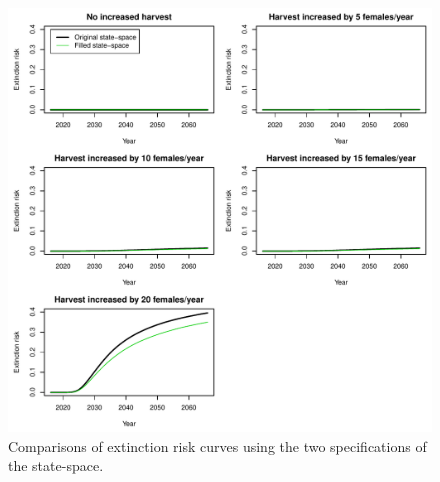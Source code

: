 \documentclass[12pt]{article}
\begin{document}
\begin{figure}[h]
  \centering
  \includegraphics[width=\textwidth]{figs/EX_SS1vSS2} 
  \caption{Comparisons of extinction risk curves using the
    two specifications of the state-space.}
  \label{fig:EX}
\end{figure}
\end{document}
